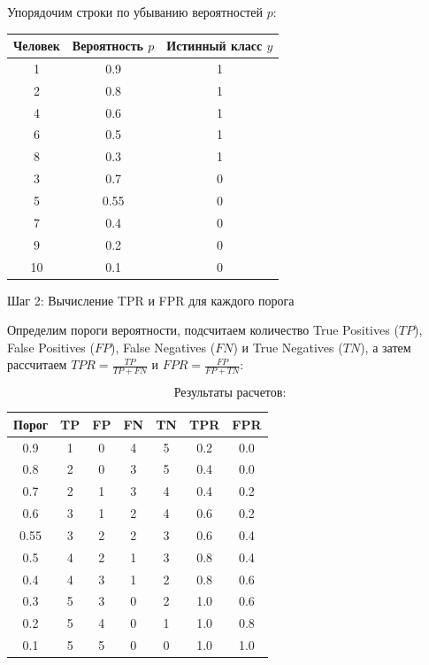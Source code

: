 Упорядочим строки по убыванию вероятностей $p$:

\begin{table}[h!]
\centering
\begin{tabular}{|c|c|c|}
\hline
\textbf{Человек} & \textbf{Вероятность $p$} & \textbf{Истинный класс $y$} \\
\hline
1 & 0.9 & 1 \\
2 & 0.8 & 1 \\
4 & 0.6 & 1 \\
6 & 0.5 & 1 \\
8 & 0.3 & 1 \\
3 & 0.7 & 0 \\
5 & 0.55 & 0 \\
7 & 0.4 & 0 \\
9 & 0.2 & 0 \\
10 & 0.1 & 0 \\
\hline
\end{tabular}
\end{table}

Шаг 2: Вычисление TPR и FPR для каждого порога

Определим пороги вероятности, подсчитаем количество True Positives ($TP$), False Positives ($FP$), False Negatives ($FN$) и True Negatives ($TN$), а затем рассчитаем $TPR = \frac{TP}{TP + FN}$ и $FPR = \frac{FP}{FP + TN}$:

\[
\text{Результаты расчетов:}
\]

\begin{table}[h!]
\centering
\begin{tabular}{|c|c|c|c|c|c|c|}
\hline
\textbf{Порог} & \textbf{TP} & \textbf{FP} & \textbf{FN} & \textbf{TN} & \textbf{TPR} & \textbf{FPR} \\
\hline
0.9 & 1 & 0 & 4 & 5 & 0.2 & 0.0 \\
0.8 & 2 & 0 & 3 & 5 & 0.4 & 0.0 \\
0.7 & 2 & 1 & 3 & 4 & 0.4 & 0.2 \\
0.6 & 3 & 1 & 2 & 4 & 0.6 & 0.2 \\
0.55 & 3 & 2 & 2 & 3 & 0.6 & 0.4 \\
0.5 & 4 & 2 & 1 & 3 & 0.8 & 0.4 \\
0.4 & 4 & 3 & 1 & 2 & 0.8 & 0.6 \\
0.3 & 5 & 3 & 0 & 2 & 1.0 & 0.6 \\
0.2 & 5 & 4 & 0 & 1 & 1.0 & 0.8 \\
0.1 & 5 & 5 & 0 & 0 & 1.0 & 1.0 \\
\hline
\end{tabular}
\end{table}




